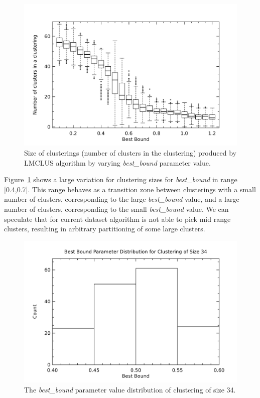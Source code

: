 \begin{figure}[H]
\center
\includegraphics[width=5.5in]{img/mdl-clust_best-bound-cls_1.pdf}
\caption{Size of clusterings (number of clusters in the clustering) produced by LMCLUS algorithm by varying \emph{best\_bound} parameter value.}
\label{fig:best-bound-cls}
\end{figure}



Figure~\ref{fig:best-bound-cls} shows a large variation for clustering sizes
for \emph{best\_bound} in range [0.4,0.7]. This range behaves as a transition
zone between clusterings with a small number of clusters, corresponding to
the large \emph{best\_bound} value, and a large number of clusters,
corresponding to the small \emph{best\_bound} value. We can speculate that for
current dataset algorithm is not able to pick mid range clusters, resulting
in arbitrary partitioning of some large clusters.

\begin{figure}[H]
\center
\includegraphics[width=4.5in]{img/mdl-clust_best-bound-cl-34_1.pdf}
\caption{The \emph{best\_bound} parameter value distribution of clustering of size 34.}
\label{fig:best-bound-cl-34}
\end{figure}



